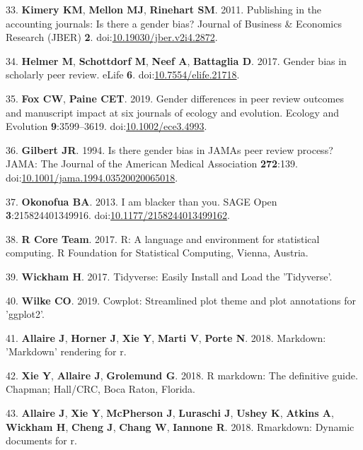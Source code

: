 \documentclass[10pt,]{article}
\begin{document}
\hypertarget{ref-Kimery2011}{}
33. \textbf{Kimery KM}, \textbf{Mellon MJ}, \textbf{Rinehart SM}. 2011.
Publishing in the accounting journals: Is there a gender bias? Journal
of Business \& Economics Research (JBER) \textbf{2}.
doi:\href{https://doi.org/10.19030/jber.v2i4.2872}{10.19030/jber.v2i4.2872}.

\hypertarget{ref-Helmer2017}{}
34. \textbf{Helmer M}, \textbf{Schottdorf M}, \textbf{Neef A},
\textbf{Battaglia D}. 2017. Gender bias in scholarly peer review. eLife
\textbf{6}.
doi:\href{https://doi.org/10.7554/elife.21718}{10.7554/elife.21718}.

\hypertarget{ref-Fox2019}{}
35. \textbf{Fox CW}, \textbf{Paine CET}. 2019. Gender differences in
peer review outcomes and manuscript impact at six journals of ecology
and evolution. Ecology and Evolution \textbf{9}:3599--3619.
doi:\href{https://doi.org/10.1002/ece3.4993}{10.1002/ece3.4993}.

\hypertarget{ref-Gilbert1994}{}
36. \textbf{Gilbert JR}. 1994. Is there gender bias in JAMAs peer review
process? JAMA: The Journal of the American Medical Association
\textbf{272}:139.
doi:\href{https://doi.org/10.1001/jama.1994.03520020065018}{10.1001/jama.1994.03520020065018}.

\hypertarget{ref-Okonofua2013}{}
37. \textbf{Okonofua BA}. 2013. I am blacker than you. SAGE Open
\textbf{3}:215824401349916.
doi:\href{https://doi.org/10.1177/2158244013499162}{10.1177/2158244013499162}.

\hypertarget{ref-R_software_2017}{}
38. \textbf{R Core Team}. 2017. R: A language and environment for
statistical computing. R Foundation for Statistical Computing, Vienna,
Austria.

\hypertarget{ref-wickham_tidyverse_2017}{}
39. \textbf{Wickham H}. 2017. Tidyverse: Easily Install and Load the
'Tidyverse'.

\hypertarget{ref-cowplot}{}
40. \textbf{Wilke CO}. 2019. Cowplot: Streamlined plot theme and plot
annotations for 'ggplot2'.

\hypertarget{ref-markdown}{}
41. \textbf{Allaire J}, \textbf{Horner J}, \textbf{Xie Y}, \textbf{Marti
V}, \textbf{Porte N}. 2018. Markdown: 'Markdown' rendering for r.

\hypertarget{ref-rmd_book}{}
42. \textbf{Xie Y}, \textbf{Allaire J}, \textbf{Grolemund G}. 2018. R
markdown: The definitive guide. Chapman; Hall/CRC, Boca Raton, Florida.

\hypertarget{ref-rmd_rstudio}{}
43. \textbf{Allaire J}, \textbf{Xie Y}, \textbf{McPherson J},
\textbf{Luraschi J}, \textbf{Ushey K}, \textbf{Atkins A},
\textbf{Wickham H}, \textbf{Cheng J}, \textbf{Chang W}, \textbf{Iannone
R}. 2018. Rmarkdown: Dynamic documents for r.
\end{document}
